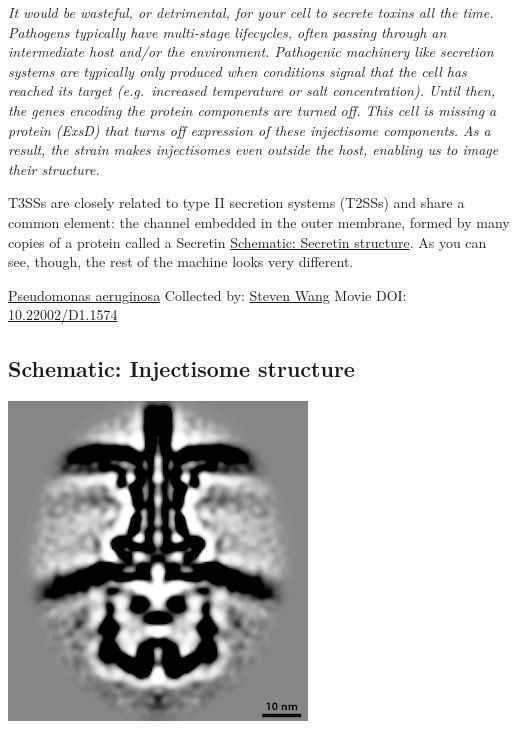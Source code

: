 \documentclass[]{tufte-book}
\begin{document}
\emph{It would be wasteful, or detrimental, for your cell to secrete toxins all the time. Pathogens typically have multi-stage lifecycles, often passing through an intermediate host and/or the environment. Pathogenic machinery like secretion systems are typically only produced when conditions signal that the cell has reached its target (e.g.~increased temperature or salt concentration). Until then, the genes encoding the protein components are turned off. This cell is missing a protein (ExsD) that turns off expression of these injectisome components. As a result, the strain makes injectisomes even outside the host, enabling us to image their structure.}

T3SSs are closely related to type II secretion systems (T2SSs) and share a common element: the channel embedded in the outer membrane, formed by many copies of a protein called a Secretin \protect\hyperlink{Secretin_structure}{Schematic: Secretin structure}. As you can see, though, the rest of the machine looks very different.



\hypertarget{htmlwidget-3b859a9769692b6d0bc1}{}

\label{fig:9-4}\protect\hyperlink{tree}{Pseudomonas aeruginosa} Collected by: \protect\hyperlink{steven_wang}{Steven Wang} Movie DOI: \href{https://doi.org/10.22002/D1.1574}{10.22002/D1.1574}

\hypertarget{Injectisome_structure}{%
\subsection*{Schematic: Injectisome structure}\label{Injectisome_structure}}

\includegraphics{img/schematics/9_4_1}
\end{document}

